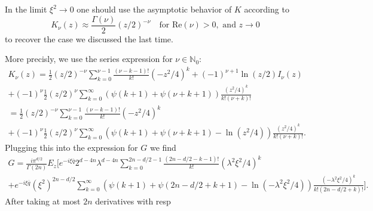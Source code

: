 \documentclass[a4paper,11pt]{article}
\begin{document}
In the limit \(\xi^2\rightarrow 0\) one should 
use the asymptotic behavior of \(K\) according to
\begin{equation}
K_\nu(z)\approx \frac{\Gamma(\nu)}{2} (z/2)^{-\nu} \quad \text{for Re}(\nu)>0, \text{ and } z\rightarrow 0 
\end{equation}
to recover the case we discussed the last time.

More precisly, we use the series expression for \(\nu\in\mathbb{N}_0\):
\begin{align}
  K_\nu(z)=\frac{1}{2}(z/2)^{-\nu}\sum_{k=0}^{\nu-1}\frac{(\nu-k-1)!}{k!}(-z^2/4)^k
  +(-1)^{\nu+1}\ln(z/2)I_{\nu}(z)\\
  +(-1)^\nu \frac{1}{2}(z/2)^\nu \sum_{k=0}^\infty (\psi(k+1)+\psi(\nu+k+1))\frac{(z^2/4)^k}{k!(\nu+k)!}\\
  =\frac{1}{2}(z/2)^{-\nu}\sum_{k=0}^{\nu-1}\frac{(\nu-k-1)!}{k!}(-z^2/4)^k\\
  +(-1)^\nu \frac{1}{2}(z/2)^\nu \sum_{k=0}^\infty (\psi(k+1)+\psi(\nu+k+1)-\ln(z^2/4))\frac{(z^2/4)^k}{k!(\nu+k)!}.
\end{align}
Plugging this into the expression for \(G\)
we find
\begin{align}
  G=\frac{i \pi^{d/2}}{\Gamma(2n)} E_z\Bigg[e^{-i\xi \overline{q}}2^{d-4n}\lambda^{d-4n}\sum_{k=0}^{2n-d/2-1}\frac{(2n-d/2-k-1)!}{k!}(\lambda^2\xi^2/4)^k\\
   +e^{-i\xi\overline{q}}(\xi^2)^{2n-d/2} \sum_{k=0}^\infty (\psi(k+1)+\psi(2n-d/2+k+1)-\ln(-\lambda^2 \xi^2/4))\frac{(-\lambda^2\xi^2/4)^k}{k!(2n-d/2+k)!} \Bigg].
\end{align}
After taking at most \(2n\) derivatives with
resp
\end{document}
